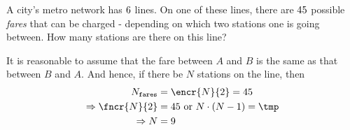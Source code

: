



\gcalcexpr[0]

\question[2] A city's metro network has $6$ lines. On one of these lines, there are $45$ 
possible \textit{fares} that can be charged - depending on which two stations one is going between.
 How many stations are there on this line? 


\watchout

\ifprintanswers
\fi 

\begin{solution}[\mcq]
   It is reasonable to assume that the fare between $A$ and $B$ is the same as that 
   between $B$ and $A$. And hence, if there be $N$ stations on the line, then
   \begin{align}
   		N_{\texttt{fares}} &= \encr{N}{2} = \vbtwo \\
   		\Rightarrow \fncr{N}{2} &= \vbtwo \text{ or } N\cdot(N-1) = \tmp \\
   		\Rightarrow N &= \vbthree
   \end{align}
\end{solution}
